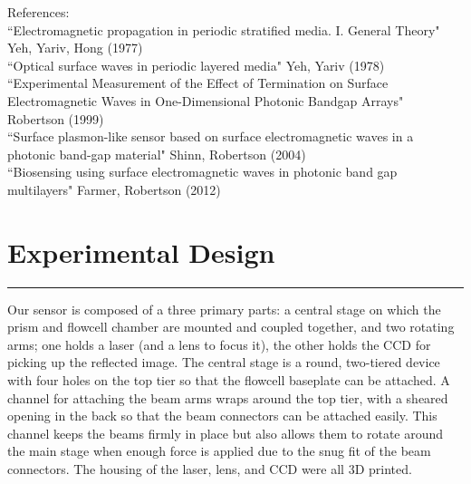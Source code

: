 \documentclass{report}
\begin{document}
\begin{flushleft}
{	References:\\
	``Electromagnetic propagation in periodic stratified media. I. General Theory" Yeh, Yariv, Hong (1977)\\
	``Optical surface waves in periodic layered media" Yeh, Yariv (1978)\\
	``Experimental Measurement of the Effect of Termination on Surface Electromagnetic Waves in One-Dimensional Photonic Bandgap Arrays" Robertson (1999)\\
	``Surface plasmon-like sensor based on surface electromagnetic waves in a photonic band-gap material" Shinn, Robertson (2004)\\
	``Biosensing using surface electromagnetic waves in photonic band gap multilayers" Farmer, Robertson (2012)\\
	}
	\section*{Experimental Design}
	\vspace{-0.1cm}\hrule\vspace{0.2cm}
	\par{Our sensor is composed of a three primary parts: a central stage on which the prism and flowcell chamber are mounted and coupled together, and two rotating arms; one holds a laser (and a lens to focus it), the other holds the CCD for picking up the reflected image. The central stage is a round, two-tiered device with four holes on the top tier so that the flowcell baseplate can be attached. A channel for attaching the beam arms wraps around the top tier, with a sheared opening in the back so that the beam connectors can be attached easily. This channel keeps the beams firmly in place but also allows them to rotate around the main stage when enough force is applied due to the snug fit of the beam connectors. The housing of the laser, lens, and CCD were all 3D printed.\\}
	\vspace{0.5cm}
	\begin{figure}[h]
		\centering

\end{figure}
\end{flushleft}
\end{document}
